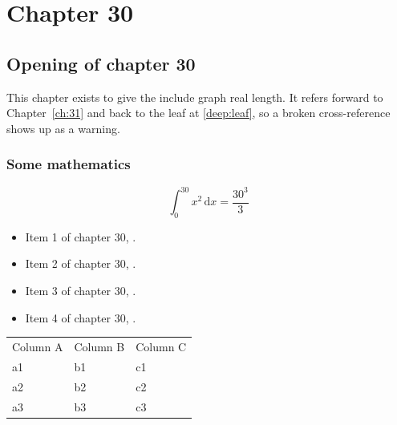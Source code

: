 \chapter{Chapter 30}
\label{ch:30}
\section{Opening of chapter 30}
This chapter exists to give the include graph real length. It refers
forward to Chapter~\ref{ch:31} and back to the leaf
at \ref{deep:leaf}, so a broken cross-reference shows up as a warning.

\subsection{Some mathematics}
\begin{equation}
  \int_0^{30} x^{2} \, \mathrm{d}x = \frac{30^{3}}{3}
\end{equation}

\begin{itemize}
  \item Item 1 of chapter 30, .
  \item Item 2 of chapter 30, .
  \item Item 3 of chapter 30, .
  \item Item 4 of chapter 30, .
\end{itemize}

\begin{tabular}{lll}
  Column A & Column B & Column C \\
  a1 & b1 & c1 \\
  a2 & b2 & c2 \\
  a3 & b3 & c3 \\
\end{tabular}
